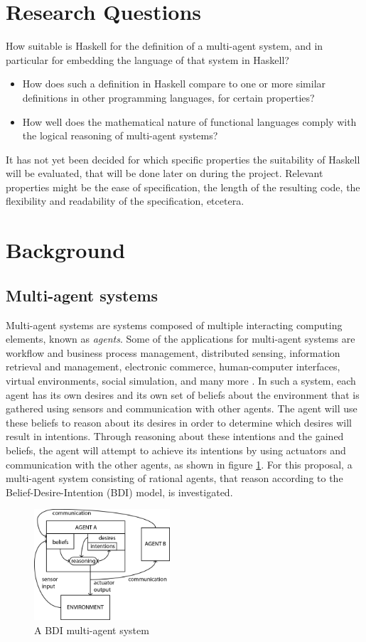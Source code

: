 \documentclass{sig-alternate-br}
\begin{document}
\section{Research Questions}
How suitable is Haskell for the definition of a multi-agent system, and in particular for embedding the language of that system in Haskell?
\begin{itemize}
\item How does such a definition in Haskell compare to one or more similar definitions in other programming languages, for certain properties?
\item How well does the mathematical nature of functional languages comply with the logical reasoning of multi-agent systems?
\end{itemize}
It has not yet been decided for which specific properties the suitability of Haskell will be evaluated, that will be done later on during the project. Relevant properties might be the ease of specification, the length of the resulting code, the flexibility and readability of the specification, etcetera.

\section{Background}
\subsection{Multi-agent systems}
Multi-agent systems are systems composed of multiple interacting computing elements, known as {\it agents}. Some of the applications for multi-agent systems are
workflow and business process management,
distributed sensing,
information retrieval and management,
electronic commerce,
human-computer interfaces,
virtual environments,
social simulation, and many more \cite{b:mas}. In such a system, each agent has its own desires and its own set of beliefs about the environment that is gathered using sensors and communication with other agents. The agent will use these beliefs to reason about its desires in order to determine which desires will result in intentions. Through reasoning about these intentions and the gained beliefs, the agent will attempt to achieve its intentions by using actuators and communication with the other agents, as shown in figure \ref{fig:mas}. For this proposal, a multi-agent system consisting of rational agents, that reason according to the Belief-Desire-Intention (BDI) model, is investigated.
\begin{figure}[h]
\centering
\includegraphics[width=0.45\textwidth]{mas}
\caption{A BDI multi-agent system}
\label{fig:mas}
\end{figure}
\end{document}
